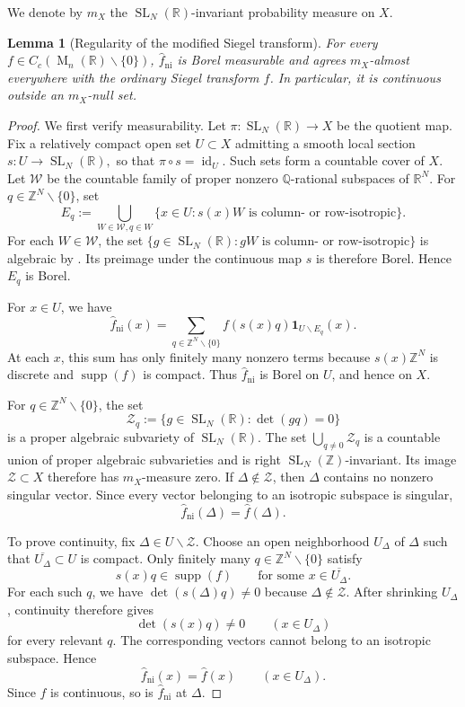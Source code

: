 \documentclass[reqno,11pt]{amsart}
\numberwithin{equation}{section}
\newtheorem{lemma}[theorem]{Lemma}
\theoremstyle{definition}
\theoremstyle{remark}
\newcommand{\op}{\operatorname}
\newcommand{\R}{\mathbb R}
\newcommand{\Z}{\mathbb Z}\newcommand{\Q}{\mathbb Q}
\newcommand{\M}{\op{M}}
\newcommand{\SL}{\op{SL}}
\begin{document}
We denote by $m_X$ the $\SL_N(\R)$-invariant probability measure on
$X$.

\begin{lemma}[Regularity of the modified Siegel transform]
\label{lem:modified-transform-regularity}
For every $f\in C_c(\M_n(\R)\smallsetminus\{0\})$,
$\widehat f_{\operatorname{ni}}$ is Borel measurable and agrees
$m_X$-almost everywhere with the ordinary Siegel transform $\widehat f$.
In particular, it is continuous outside an $m_X$-null set.
\end{lemma}
\begin{proof}
We first verify measurability. Let
$
\pi:\SL_N(\mathbb R)\to X
$
be the quotient map. Fix a relatively compact open set
$U\subset X$ admitting a smooth local section
$
s:U\to\SL_N(\mathbb R),
$
so that $\pi\circ s=\operatorname{id}_U$. Such sets form a countable
cover of $X$. 
Let $\mathscr W$ be the countable family of proper nonzero
$\mathbb Q$-rational subspaces of $\mathbb R^N$. For
$q\in\mathbb Z^N\smallsetminus\{0\}$, set
$$
E_q
:=
\bigcup_{{W\in\mathscr W, q\in W}}
\{x\in U:s(x)W\text{ is column- or row-isotropic}\}.
$$
For each $W\in\mathscr W$, the set
$\{g\in\SL_N(\mathbb R):gW\text{ is column- or row-isotropic}\}$
is algebraic by . Its preimage under
the continuous map $s$ is therefore Borel. Hence $E_q$ is Borel.

For $x\in U$, we have
$$
\widehat f_{\operatorname{ni}}(x)
=
\sum_{q\in\mathbb Z^N\smallsetminus\{0\}}
f(s(x)q)\mathbf 1_{U\smallsetminus E_q}(x).
$$
At each $x$, this sum has only finitely many nonzero terms because
$s(x)\mathbb Z^N$ is discrete and $\operatorname{supp}(f)$ is compact.
Thus $\widehat f_{\operatorname{ni}}$ is Borel on $U$, and hence on
$X$.

For $q\in\Z^N\smallsetminus\{0\}$, the set
$$
\mathcal Z_q
:=
\{g\in\SL_N(\R):\det(gq)=0\}
$$
is a proper algebraic subvariety of $\SL_N(\R)$. The set
$\bigcup_{q\ne0}\mathcal Z_q$ is a countable union of  proper algebraic subvarieties and is right
$\SL_N(\Z)$-invariant. Its image $\mathcal Z\subset X$ therefore has
$m_X$-measure zero. If $\Delta\notin\mathcal Z$, then $\Delta$ contains
no nonzero singular vector. Since every vector belonging to an isotropic subspace
is singular,
$$
\widehat f_{\operatorname{ni}}(\Delta)=\widehat f(\Delta).
$$

To prove continuity,  fix $\Delta\in U\smallsetminus\mathcal Z$. Choose
an open neighborhood $U_\Delta$ of $\Delta$ such that
$\overline{U_\Delta}\subset U$ is compact.
Only finitely many
$q\in\mathbb Z^N\smallsetminus\{0\}$ satisfy
$$
s(x)q\in\operatorname{supp}(f)
\qquad\text{for some }x\in \overline{U_\Delta}.
$$
For each such $q$, we have
$
\det(s(\Delta)q)\ne0
$
because $\Delta\notin\mathcal Z$. After shrinking $U_\Delta$, continuity
therefore gives
$$
\det(s(x)q)\ne0
\qquad(x\in U_\Delta)
$$
for every relevant $q$. The corresponding vectors cannot belong to an isotropic
subspace. Hence
$$
\widehat f_{\operatorname{ni}}(x)=\widehat f(x)
\qquad(x\in U_\Delta).
$$
Since $\widehat f$ is continuous, so is
$\widehat f_{\operatorname{ni}}$ at $\Delta$.
\end{proof}
\end{document}
